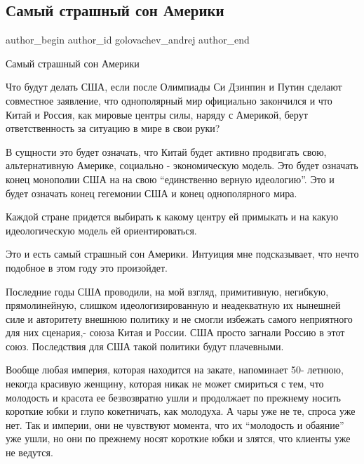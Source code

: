  
 
 
 
 
 
\subsection{Самый страшный сон Америки}
\label{sec:26_01_2022.fb.golovachev_andrej.1.strashnyj_son_ameriki}
 
\ifcmt
 author_begin
   author_id golovachev_andrej
 author_end
\fi


Самый страшный сон Америки

Что будут делать США, если после Олимпиады Си Дзинпин и Путин сделают
совместное заявление, что однополярный мир официально закончился и что Китай и
Россия, как мировые центры силы, наряду  с Америкой,  берут ответственность за
ситуацию в мире в свои руки?

В сущности это будет означать, что Китай будет активно продвигать свою,
альтернативную Америке, социально - экономическую модель. Это будет означать
конец монополии США на на свою \enquote{единственно верную идеологию}. Это и
будет означать конец гегемонии США и конец однополярного мира. 

Каждой стране придется выбирать к какому центру  ей примыкать и на какую
идеологическую модель ей ориентироваться.

Это и есть самый страшный сон Америки. Интуиция мне подсказывает, что нечто
подобное  в этом году это произойдет.

Последние годы США проводили, на мой взгляд, примитивную, негибкую,
прямолинейную, слишком идеологизированную и неадекватную  их нынешней силе   и
авторитету   внешнюю политику и не смогли избежать самого неприятного для них
сценария,- союза Китая и России. США просто загнали Россию в этот союз.
Последствия для США такой политики будут плачевными.

Вообще любая империя, которая находится на закате,  напоминает 50-  летнюю,
некогда красивую женщину, которая никак не может смириться с тем, что молодость
и  красота ее безвозвратно ушли и продолжает по прежнему  носить короткие юбки
и глупо кокетничать, как молодуха. А  чары уже не те,  спроса уже нет. Так и
империи, они не чувствуют момента, что их \enquote{молодость и обаяние} уже
ушли, но они по прежнему носят короткие юбки и злятся, что клиенты уже не
ведутся.
